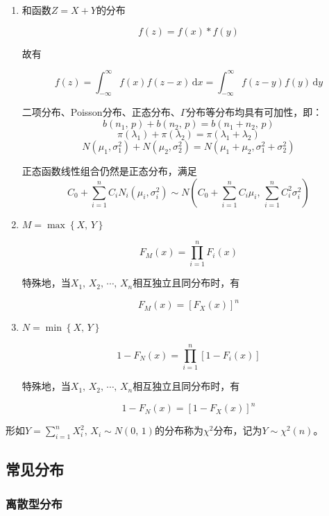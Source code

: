 \documentclass[UTF8,fontset=fandol,zihao=5]{ctexart}
\newcommand{\dd}{\,\mathrm{d}}
\begin{document}
  \begin{enumerate}

  \item 和函数$Z=X+Y$的分布
  
  \[
  f(z) = f(x) \ast f(y)
  \]

  故有

  \[
  f(z) = \int_{-\infty}^{\infty} f(x)f(z-x)\dd x = \int_{-\infty}^{\infty} f(z-y)f(y)\dd y
  \]

  二项分布、Poisson分布、正态分布、$\Gamma$分布等分布均具有可加性，即：
  \[
  b(n_1,\,p)+b(n_2,\,p)=b(n_1+n_2,\,p)
  \]
  \[
  \pi(\lambda_1)+\pi(\lambda_2)=\pi(\lambda_1+\lambda_2)
  \]
  \[
  N(\mu_1,\sigma_1^2)+N(\mu_2,\sigma_2^2)=N(\mu_1+\mu_2,\sigma_1^2+\sigma_2^2)
  \]

  \begin{methodbox}[正态分布线性组合]
    正态函数线性组合仍然是正态分布，满足
    \[
    C_0+\sum_{i=1}^{n}C_i N_i(\mu_i,\sigma_i^2) \sim N\left(C_0+\sum_{i=1}^{n}C_i \mu_i,\,\sum_{i=1}^{n}C_i^2 \sigma_i^2\right)
    \]
  \end{methodbox}

  \item $M=\max\left\{X,\,Y\right\}$
  
  \[
  F_M(x)=\prod_{i=1}^{n}F_i(x)
  \]
  
  特殊地，当$X_1,\,X_2,\,\cdots,\,X_n$相互独立且同分布时，有
  
  \[
  F_M(x)=[F_X(x)]^n
  \]

  \item $N=\min\left\{X,\,Y\right\}$
  
  \[
  1-F_N(x)=\prod_{i=1}^{n}[1-F_i(x)]
  \]
  
  特殊地，当$X_1,\,X_2,\,\cdots,\,X_n$相互独立且同分布时，有
  
  \[
  1-F_N(x)=[1-F_X(x)]^n
  \]

\end{enumerate}

\begin{methodbox}[$\chi^2$分布]
  形如$Y=\sum_{i=1}^{n}X_i^2,\,X_i\sim N(0,\,1)$的分布称为$\chi^2$分布，记为$Y\sim \chi^2(n)$。
\end{methodbox}

  \subsection{常见分布}

\subsubsection{离散型分布}
\end{document}
